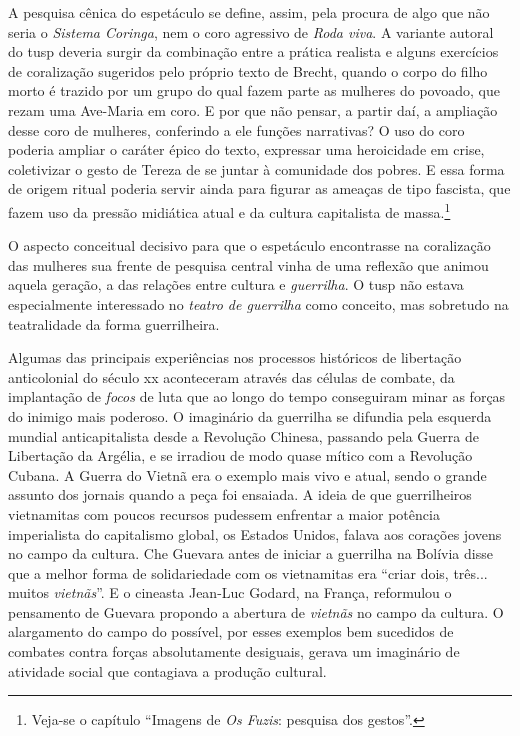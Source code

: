 A pesquisa cênica do espetáculo se define, assim, pela procura de algo
que não seria o {\it Sistema Coringa}, nem o coro agressivo de {\it Roda
viva}. A variante autoral do {\sc tusp} deveria surgir da combinação entre a
prática realista e alguns exercícios de coralização sugeridos pelo
próprio texto de Brecht, quando o corpo do filho morto é trazido por um
grupo do qual fazem parte as mulheres do povoado, que rezam uma
Ave-Maria em coro. E por que não pensar, a partir daí, a ampliação desse
coro de mulheres, conferindo a ele funções narrativas? O uso do coro
poderia ampliar o caráter épico do texto, expressar uma heroicidade em
crise, coletivizar o gesto de Tereza de se juntar à comunidade dos
pobres. E essa forma de origem ritual poderia servir ainda para figurar
as ameaças de tipo fascista, que fazem uso da pressão midiática atual e
da cultura capitalista de massa.\footnote{Veja-se o capítulo “Imagens de
  {\it Os Fuzis}: pesquisa dos gestos”.}

\subject{Imaginário guerrilheiro}

O aspecto conceitual decisivo para que o espetáculo encontrasse na
coralização das mulheres sua frente de pesquisa central vinha de uma
reflexão que animou aquela geração, a das relações entre cultura e
{\it guerrilha}. O {\sc tusp} não estava especialmente interessado no
{\it teatro de guerrilha} como conceito, mas sobretudo na teatralidade
da forma guerrilheira.

Algumas das principais experiências nos processos históricos de
libertação anticolonial do século {\sc xx} aconteceram através das células de
combate, da implantação de {\it focos} de luta que ao longo do tempo
conseguiram minar as forças do inimigo mais poderoso. O imaginário da
guerrilha se difundia pela esquerda mundial anticapitalista desde a
Revolução Chinesa, passando pela Guerra de Libertação da Argélia, e se
irradiou de modo quase mítico com a Revolução Cubana. A Guerra do Vietnã
era o exemplo mais vivo e atual, sendo o grande assunto dos jornais
quando a peça foi ensaiada. A ideia de que guerrilheiros vietnamitas com
poucos recursos pudessem enfrentar a maior potência imperialista do
capitalismo global, os Estados Unidos, falava aos corações jovens no
campo da cultura. Che Guevara antes de iniciar a guerrilha na Bolívia
disse que a melhor forma de solidariedade com os vietnamitas era “criar
dois, três... muitos {\it vietnãs}”. E o cineasta Jean-Luc Godard, na
França, reformulou o pensamento de Guevara propondo a abertura de
{\it vietnãs} no campo da cultura. O alargamento do campo do possível,
por esses exemplos bem sucedidos de combates contra forças absolutamente
desiguais, gerava um imaginário de atividade social que contagiava a
produção cultural.

